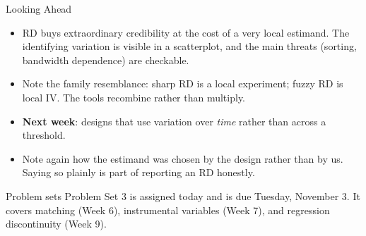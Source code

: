 \documentclass[aspectratio=169,11pt,xcolor=dvipsnames]{beamer}
\begin{document}
\begin{frame}{Looking Ahead}
\begin{itemize}\itemsep4pt
  \item RD buys extraordinary credibility at the cost of a very local estimand.
        The identifying variation is visible in a scatterplot, and the main
        threats (sorting, bandwidth dependence) are checkable.
  \item Note the family resemblance: sharp RD is a local experiment; fuzzy RD is
        local IV. The tools recombine rather than multiply.
  \item \textbf{Next week}: designs that use variation over \emph{time} rather
        than across a threshold.
  \item Note again how the estimand was chosen by the design rather than by us.
        Saying so plainly is part of reporting an RD honestly.
\end{itemize}
\vskip4pt
\begin{block}{Problem sets}
Problem Set 3 is assigned today and is due Tuesday, November 3. It covers
matching (Week 6), instrumental variables (Week 7), and regression discontinuity (Week 9).
\end{block}
\end{frame}
\end{document}

